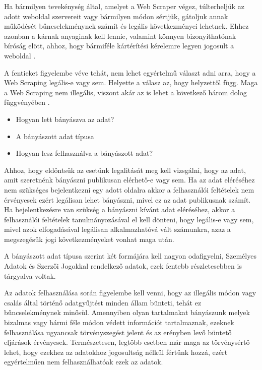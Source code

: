 Ha bármilyen tevekénység által, amelyet a Web Scraper végez, túlterheljük az adott weboldal szervereit vagy bármilyen módon sértjük, gátoljuk annak működését bűncselekménynek számít és legális következményei lehetnek. Ehhez azonban a kárnak anyaginak kell lennie, valamint könnyen bizonyíthatónak bíróság elött, ahhoz, hogy bármiféle kártérítési kérelemre legyen jogosult a weboldal \cite{krotov2018legality}. 

A fentieket figyelembe véve tehát, nem lehet egyértelmű választ adni arra, hogy a Web Scraping legális-e vagy sem. Helyette a válasz az, hogy helyzettől függ. Maga a Web Scraping nem illegális, viszont akár az is lehet a következő három dolog függvényében \cite{isWSLegal}. 

\begin{itemize}
    \item Hogyan lett bányászva az adat?
    \item A bányászott adat típusa
    \item Hogyan lesz felhasználva a bányászott adat?
\end{itemize}

Ahhoz, hogy eldöntsük az esetünk legalitását meg kell vizsgálni, hogy az adat, amit szeretnénk bányászni publikusan elérhető-e vagy sem. Ha az adat eléréséhez nem szükséges bejelentkezni egy adott oldalra akkor a felhasználói feltételek nem érvényesek ezért legálisan lehet bányászni, mivel ez az adat publikusnak számít. Ha bejelentkezésre van szükség a bányászni kívánt adat eléréséhez, akkor a felhasználói feltételek tanulmányozásával el kell dönteni, hogy legális-e vagy sem, mivel azok elfogadásával legálisan alkalmazhatóvá vált számunkra, azaz a megszegésük jogi következményeket vonhat maga után.

A bányászott adat típusa szerint két formájára kell nagyon odafigyelni, Személyes Adatok és Szerzői Jogokkal rendelkező adatok, ezek fentebb részletesebben is tárgyalva voltak.

Az adatok felhasználása során figyelembe kell venni, hogy az illegális módon vagy csalás által történő adatgyűjtést minden állam bünteti, tehát ez bűncselekménynek minősül. Amennyiben olyan tartalmakat bányászunk melyek bizalmas vagy bármi féle módon védett információt tartalmaznak, ezeknek felhasználása ugyancsak törvényszegést jelent és az erényben levő büntető eljárások érvényesek. Természetesen, legtöbb esetben már maga az törvénysértő lehet, hogy ezekhez az adatokhoz jogosultság nélkül fértünk hozzá, ezért egyértelműen nem felhasználhatóak ezek az adatok. 

